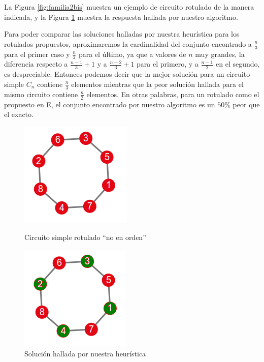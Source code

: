 La Figura \ref{fig:familia2bis} muestra un ejemplo de circuito rotulado de la manera indicada, y la Figura \ref{fig:familia2bisres} muestra la respuesta hallada por nuestro algoritmo.

\vspace*{0.3cm}

Para poder comparar las soluciones halladas por nuestra heurística para los rotulados propuestos, aproximaremos la cardinalidad del conjunto encontrado a $\frac{n}{3}$ para el primer caso y $\frac{n}{2}$ para el último, ya que a valores de $n$ muy grandes, la diferencia respecto a $\frac{n-1}{3}+1$ y a $\frac{n-2}{3}+1$ para el primero, y a $\frac{n-1}{2}$ en el segundo, es despreciable.  Entonces podemos decir que la mejor solución para un circuito simple $C_n$ contiene $\frac{n}{3}$ elementos mientras que la peor solución hallada para el mismo circuito contiene $\frac{n}{2}$ elementos.  En otras palabras, para un rotulado como el propuesto en E, el conjunto encontrado por nuestro algoritmo es un $50\%$ peor que el exacto.

\begin{figure}[!htb]
\begin{center}
  \includegraphics[scale=0.8]{imagenes/faimilia2rename.png}
\end{center}
  \caption{Circuito simple rotulado ``no en orden''}\label{fig:familia2bis}
\endminipage\hfill
{}
\begin{center}
  \includegraphics[scale=0.8]{imagenes/faimilia2rename-solnoopt.png}
\end{center}
  \caption{Solución hallada por nuestra heurística}\label{fig:familia2bisres}
\endminipage
\end{figure}



